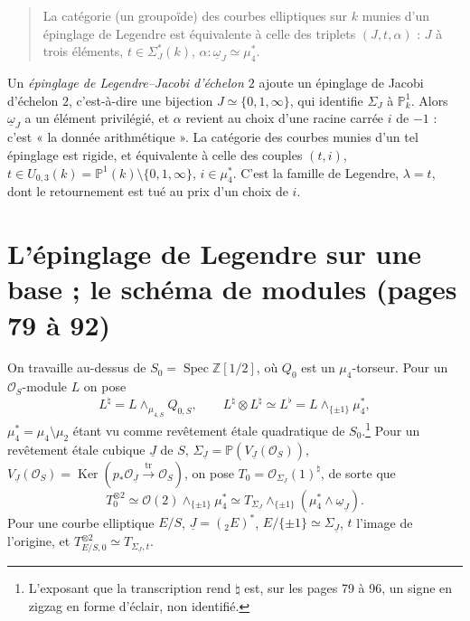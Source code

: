 \documentclass[11pt,a4paper]{article}
\begin{document}
\begin{quote}
La catégorie (un groupoïde) des courbes elliptiques sur $k$ munies d'un
épinglage de Legendre est équivalente à celle des triplets $(J, t, \alpha)$ :
$J$ à trois éléments, $t \in \Sigma^{*}_J(k)$, $\alpha : \underline{\omega}_J
\simeq \mu_4^{*}$.
\end{quote}

Un \emph{épinglage de Legendre--Jacobi d'échelon $2$} ajoute un épinglage de
Jacobi d'échelon $2$, c'est-à-dire une bijection $J \simeq \{0, 1, \infty\}$, qui identifie
$\Sigma_J$ à $\mathbb{P}^1_k$. Alors $\underline{\omega}_J$ a un élément
privilégié, et $\alpha$ revient au choix d'une racine carrée $i$ de $-1$ : c'est
« la donnée arithmétique ». La catégorie des courbes munies d'un tel épinglage
est rigide, et équivalente à celle des couples $(t, i)$, $t \in U_{0,3}(k) =
\mathbb{P}^1(k) \setminus \{0, 1, \infty\}$, $i \in \mu_4^{*}$. C'est la famille
de Legendre, $\lambda = t$, dont le retournement est tué au prix d'un choix de
$i$.

\section*{L'épinglage de Legendre sur une base ; le schéma de modules (pages 79 à 92)}

On travaille au-dessus de $S_0 = \operatorname{Spec} \mathbb{Z}[1/2]$, où $Q_0$
est un $\mu_4$-torseur. Pour un $\mathcal{O}_S$-module $L$ on pose
\[
L^{\natural} = L \wedge_{\mu_{4,S}} Q_{0,S}, \qquad L^{\natural} \otimes
L^{\natural} \simeq L^{\flat} = L \wedge_{\{\pm 1\}} \mu_4^{*},
\]
$\mu_4^{*} = \mu_4 \setminus \mu_2$ étant vu comme revêtement étale quadratique
de $S_0$.\footnote{L'exposant que la transcription rend $\natural$ est, sur les
pages 79 à 96, un signe en zigzag en forme d'éclair, non identifié.} Pour un
revêtement étale cubique $\underline{J}$ de $S$, $\Sigma_{\underline{J}} =
\mathbb{P}(V_{\underline{J}}(\mathcal{O}_S))$, $V_{\underline{J}}(\mathcal{O}_S) =
\operatorname{Ker}(p_* \mathcal{O}_{\underline{J}} \xrightarrow{\operatorname{tr}}
\mathcal{O}_S)$, on pose $T_{0} = \mathcal{O}_{\Sigma_{\underline{J}}}(1)^{\natural}$,
de sorte que
\[
T_0^{\otimes 2} \simeq \mathcal{O}(2) \wedge_{\{\pm 1\}} \mu_4^{*} \simeq
T_{\Sigma_{\underline{J}}} \wedge_{\{\pm 1\}} (\mu_4^{*} \wedge
\underline{\omega}_{\underline{J}}).
\]
Pour une courbe elliptique $E/S$, $\underline{J} = ({}_2E)^{*}$, $E/\{\pm 1\}
\simeq \Sigma_{\underline{J}}$, $t$ l'image de l'origine, et $T_{E/S,0}^{\otimes 2}
\simeq T_{\Sigma_{\underline{J}}, t}$.
\end{document}
